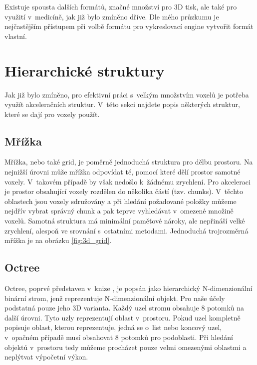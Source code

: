 Existuje spousta dalších formátů, značné množství pro 3D tisk, ale také pro využití v~medicíně, jak již bylo zmíněno dříve. Dle mého průzkumu je nejčastějším přístupem při volbě formátu pro vykreslovací engine vytvořit formát vlastní.


\section{Hierarchické struktury}
Jak již bylo zmíněno, pro efektivní práci s~velkým množstvím voxelů je potřeba využít akceleračních struktur. V~této sekci najdete popis některých struktur, které se dají pro voxely použít.

\subsection{Mřížka}
Mřížka, nebo také grid, je poměrně jednoduchá struktura pro dělbu prostoru. Na nejnižší úrovni může mřížka odpovídat té, pomocí které dělí prostor samotné voxely. V~takovém případě by však nedošlo k~žádnému zrychlení. Pro akceleraci je prostor obsahující voxely rozdělen do několika částí (tzv. chunks). V~těchto oblastech jsou voxely sdružovány a při hledání požadované položky můžeme nejdřív vybrat správný chunk a pak teprve vyhledávat v~omezené množině voxelů. Samotná struktura má minimální paměťové nároky, ale nepřináší velké zrychlení, alespoň ve srovnání s~ostatními metodami. Jednoduchá trojrozměrná mřížka je na obrázku \ref{fig:3d_grid}.

\subsection{Octree} \label{octree}
Octree, poprvé představen v~knize \cite{rensselaer1980octree}, je popsán jako hierarchický N-dimenzionální binární strom, jenž reprezentuje N-dimenzionální objekt. Pro naše účely podstatná pouze jeho 3D varianta. Každý uzel stromu obsahuje 8 potomků na další úrovni. Tyto uzly reprezentují oblast v~prostoru. Pokud uzel kompletně popisuje oblast, kterou reprezentuje, jedná se o~list nebo koncový uzel, v~opačném případě musí obsahovat 8 potomků pro podoblasti. Při hledání objektů v~prostoru tedy můžeme procházet pouze velmi omezenými oblastmi a neplýtvat výpočetní výkon.


